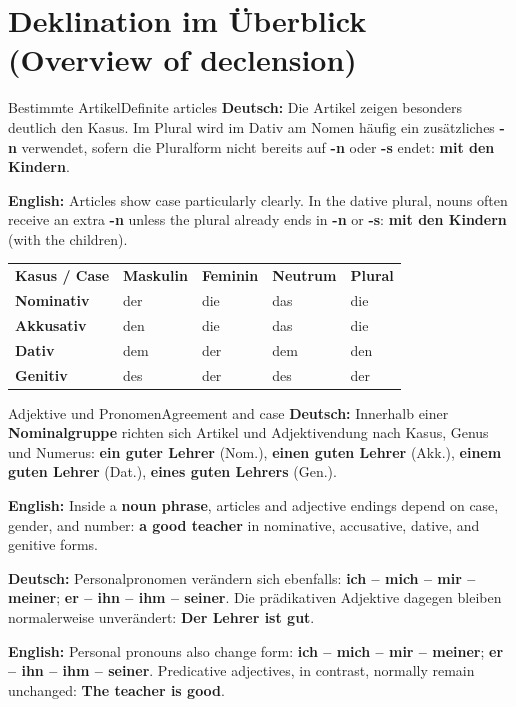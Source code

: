 \documentclass[a4paper,11pt]{article}
\newcommand{\GermanText}[1]{\textbf{Deutsch: }#1\par}
\newcommand{\EnglishText}[1]{{\small\color{SoftGray}\textbf{English: }#1\par}}
\begin{document}
    \section{Deklination im Überblick \textnormal{(Overview of declension)}}
        \begin{grammarentry}{Bestimmte Artikel}{Definite articles}
            \GermanText{Die Artikel zeigen besonders deutlich den Kasus. Im Plural wird im Dativ am Nomen häufig ein zusätzliches \textbf{-n} verwendet, sofern die Pluralform nicht bereits auf \textbf{-n} oder \textbf{-s} endet: \textbf{mit den Kindern}.}
            \EnglishText{Articles show case particularly clearly. In the dative plural, nouns often receive an extra \textbf{-n} unless the plural already ends in \textbf{-n} or \textbf{-s}: \textbf{mit den Kindern} (with the children).}
        \end{grammarentry}
        \begin{longtable}{>{\bfseries}p{3.2cm}|p{2.8cm}|p{2.8cm}|p{2.8cm}|p{2.6cm}}
            \rowcolor{HeaderBlueDark}
            \color{white}\textbf{Kasus / Case} &
            \color{white}\textbf{Maskulin} &
            \color{white}\textbf{Feminin} &
            \color{white}\textbf{Neutrum} &
            \color{white}\textbf{Plural}\\
            Nominativ & der & die & das & die\\
            Akkusativ & den & die & das & die\\
            Dativ & dem & der & dem & den\\
            Genitiv & des & der & des & der\\
        \end{longtable}
        \begin{grammarentry}{Adjektive und Pronomen}{Agreement and case}
            \GermanText{Innerhalb einer \textbf{Nominalgruppe} richten sich Artikel und Adjektivendung nach Kasus, Genus und Numerus: \textbf{ein guter Lehrer} (Nom.), \textbf{einen guten Lehrer} (Akk.), \textbf{einem guten Lehrer} (Dat.), \textbf{eines guten Lehrers} (Gen.).}
            \EnglishText{Inside a \textbf{noun phrase}, articles and adjective endings depend on case, gender, and number: \textbf{a good teacher} in nominative, accusative, dative, and genitive forms.}
            \GermanText{Personalpronomen verändern sich ebenfalls: \textbf{ich -- mich -- mir -- meiner}; \textbf{er -- ihn -- ihm -- seiner}. Die prädikativen Adjektive dagegen bleiben normalerweise unverändert: \textbf{Der Lehrer ist gut}.}
            \EnglishText{Personal pronouns also change form: \textbf{ich -- mich -- mir -- meiner}; \textbf{er -- ihn -- ihm -- seiner}. Predicative adjectives, in contrast, normally remain unchanged: \textbf{The teacher is good}.}
        \end{grammarentry}
\end{document}
